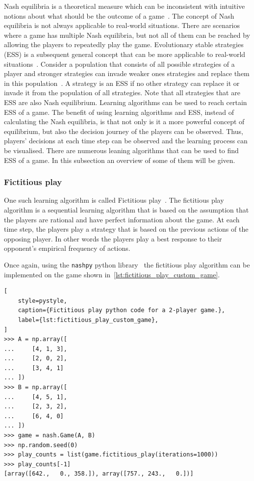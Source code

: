 Nash equilibria is a theoretical measure which can be inconsistent with
intuitive notions about what should be the outcome of a
game~\cite{myerson1978refinements}.
The concept of Nash equilibria is not always applicable to real-world
situations.
There are scenarios where a game has multiple Nash equilibria, but not all
of them can be reached by allowing the players to repeatedly play the game.
Evolutionary stable strategies (ESS) is a subsequent general concept that can
be more applicable to real-world situations~\cite{nowak1993evolutionary}.
Consider a population that consists of all possible strategies of a player and
stronger strategies can invade weaker ones strategies and replace them in this
population~\cite{smith1972game, smith1973logic}.
A strategy is an ESS if no other strategy can replace it or invade it from the
population of all strategies.
Note that all strategies that are ESS are also Nash equilibrium.
Learning algorithms can be used to reach certain ESS of a game.
The benefit of using learning algorithms and ESS, instead of calculating
the Nash equilibria, is that not only is it a more powerful concept of
equilibrium, but also the decision journey of the players can be observed.
Thus, players' decisions at each time step can be observed and the learning
process can be visualised.
There are numerous leaning algorithms that can be used to find ESS of a game.
In this subsection an overview of some of them will be given.

\subsubsection{Fictitious play}
One such learning algorithm is called Fictitious play~\cite{brownfictitiousplay,
fudenberg1998theory}.
The fictitious play algorithm is a sequential learning algorithm that is
based on the assumption that the players are rational and have perfect
information about the game.
At each time step, the players play a strategy that is based on the
previous actions of the opposing player.
In other words the players play a best response to their opponent's
empirical frequency of actions.

Once again, using the \texttt{nashpy} python
library~\cite{thenashpyproject} the fictitious play algorithm can be
implemented on the game shown in~\ref{lst:fictitious_play_custom_game}.

\begin{lstlisting}[
    style=pystyle,
    caption={Fictitious play python code for a 2-player game.},
    label={lst:fictitious_play_custom_game},
]
>>> A = np.array([
...     [4, 1, 3],
...     [2, 0, 2],
...     [3, 4, 1]
... ])
>>> B = np.array([
...     [4, 5, 1],
...     [2, 3, 2],
...     [6, 4, 0]
... ])
>>> game = nash.Game(A, B)
>>> np.random.seed(0)
>>> play_counts = list(game.fictitious_play(iterations=1000))
>>> play_counts[-1]
[array([642.,   0., 358.]), array([757., 243.,   0.])]

\end{lstlisting}

